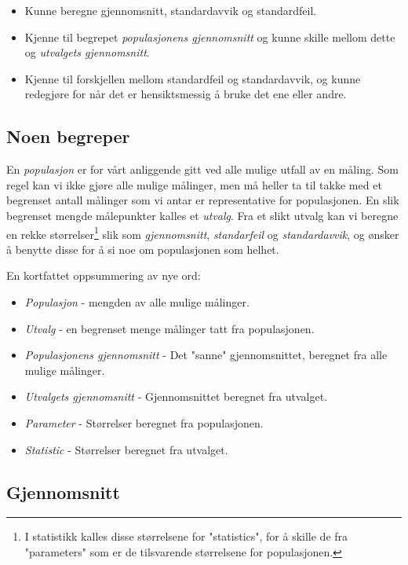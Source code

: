 \documentclass[a4paper,9pt]{article}
\begin{document}
\begin{itemize}
\item Kunne beregne gjennomsnitt, standardavvik og standardfeil.
\item Kjenne til begrepet \emph{populasjonens gjennomsnitt} og kunne skille mellom dette og \emph{utvalgets gjennomsnitt}.
\item Kjenne til forskjellen mellom standardfeil og standardavvik, og kunne redegjøre for når det er hensiktsmessig å bruke det ene eller andre.
\end{itemize}

\subsection{Noen begreper}

En \emph{populasjon} er for vårt anliggende gitt ved alle mulige utfall av en måling. Som regel kan vi ikke gjøre alle mulige målinger, men må heller ta til takke med et begrenset antall målinger som vi antar er representative for populasjonen. En slik begrenset mengde målepunkter kalles et \emph{utvalg}. 
Fra et slikt utvalg kan vi beregne en rekke størrelser\footnote{I statistikk kalles disse størrelsene for "statistics", for å skille de fra "parameters" som er de tilsvarende størrelsene for populasjonen.} slik som \emph{gjennomsnitt}, \emph{standarfeil} og \emph{standardavvik}, og ønsker å benytte disse for å si noe om populasjonen som helhet.

\vspace{.5cm}

En kortfattet oppsummering av nye ord:
\begin{itemize}
\item \emph{Populasjon} - mengden av alle mulige målinger.
\item \emph{Utvalg} - en begrenset menge målinger tatt fra populasjonen.
\item \emph{Populasjonens gjennomsnitt} - Det "sanne" gjennomsnittet, beregnet fra alle mulige målinger.
\item \emph{Utvalgets gjennomsnitt} - Gjennomsnittet beregnet fra utvalget.
\item \emph{Parameter} - Størrelser beregnet fra populasjonen.
\item \emph{Statistic} - Størrelser beregnet fra utvalget.
\end{itemize}

\subsection{Gjennomsnitt}
\end{document}
